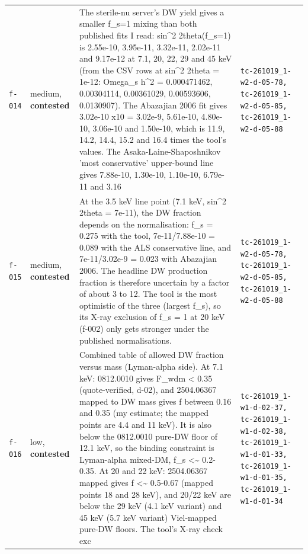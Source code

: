 \documentclass[11pt,a4paper]{article}
\begin{document}
\begin{longtable}{@{}p{}p{}p{}p{}@{}}
\texttt{f-014} & medium, \textbf{contested} & The sterile-nu server's DW yield gives a smaller f\_s=1 mixing than both published fits I read: sin\textasciicircum{}2 2theta(f\_s=1) is 2.55e-10, 3.95e-11, 3.32e-11, 2.02e-11 and 9.17e-12 at 7.1, 20, 22, 29 and 45 keV (from the CSV rows at sin\textasciicircum{}2 2theta = 1e-12: Omega\_s h\textasciicircum{}2 = 0.000471462, 0.00304114, 0.00361029, 0.00593606, 0.0130907). The Abazajian 2006 fit gives 3.02e-10 x10 = 3.02e-9, 5.61e-10, 4.80e-10, 3.06e-10 and 1.50e-10, which is 11.9, 14.2, 14.4, 15.2 and 16.4 times the tool's values. The Asaka-Laine-Shaposhnikov 'most conservative' upper-bound line gives 7.88e-10, 1.30e-10, 1.10e-10, 6.79e-11 and 3.16 & \texttt{tc-261019\_\allowbreak{}1-w2-d-05-78,\allowbreak{} tc-261019\_\allowbreak{}1-w2-d-05-85,\allowbreak{} tc-261019\_\allowbreak{}1-w2-d-05-88} \\
\texttt{f-015} & medium, \textbf{contested} & At the 3.5 keV line point (7.1 keV, sin\textasciicircum{}2 2theta = 7e-11), the DW fraction depends on the normalisation: f\_s = 0.275 with the tool, 7e-11/7.88e-10 = 0.089 with the ALS conservative line, and 7e-11/3.02e-9 = 0.023 with Abazajian 2006. The headline DW production fraction is therefore uncertain by a factor of about 3 to 12. The tool is the most optimistic of the three (largest f\_s), so its X-ray exclusion of f\_s = 1 at 20 keV (f-002) only gets stronger under the published normalisations. & \texttt{tc-261019\_\allowbreak{}1-w2-d-05-78,\allowbreak{} tc-261019\_\allowbreak{}1-w2-d-05-85,\allowbreak{} tc-261019\_\allowbreak{}1-w2-d-05-88} \\
\texttt{f-016} & low, \textbf{contested} & Combined table of allowed DW fraction versus mass (Lyman-alpha side). At 7.1 keV: 0812.0010 gives F\_wdm \textless{} 0.35 (quote-verified, d-02), and 2504.06367 mapped to DW mass gives f between 0.16 and 0.35 (my estimate; the mapped points are 4.4 and 11 keV). It is also below the 0812.0010 pure-DW floor of 12.1 keV, so the binding constraint is Lyman-alpha mixed-DM, f\_s \textless{}\textasciitilde{} 0.2-0.35. At 20 and 22 keV: 2504.06367 mapped gives f \textless{}\textasciitilde{} 0.5-0.67 (mapped points 18 and 28 keV), and 20/22 keV are below the 29 keV (4.1 keV variant) and 45 keV (5.7 keV variant) Viel-mapped pure-DW floors. The tool's X-ray check exc & \texttt{tc-261019\_\allowbreak{}1-w1-d-02-37,\allowbreak{} tc-261019\_\allowbreak{}1-w1-d-02-38,\allowbreak{} tc-261019\_\allowbreak{}1-w1-d-01-33,\allowbreak{} tc-261019\_\allowbreak{}1-w1-d-01-35,\allowbreak{} tc-261019\_\allowbreak{}1-w1-d-01-34} \\
\bottomrule\end{longtable}
\end{document}
